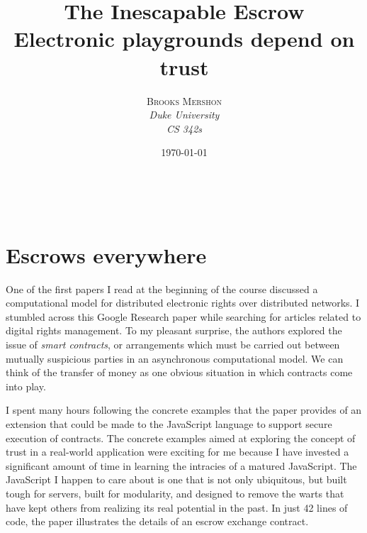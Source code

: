 \documentclass[a4paper, 11pt]{article} %
\title{\textbf{The Inescapable Escrow}\\ %
Electronic playgrounds depend on trust} %
\author{\textsc{Brooks Mershon} %
\\{\textit{Duke University}} %
\\{\textit{CS 342s}}} %
\date{\today} %
\makeatletter
\renewcommand{\maketitle}{ %
\begin{flushright} %
{\LARGE\@title} %

\vspace{50pt} %

{\large\@author} %
\\\@date %

\end{flushright}
}
\makeatother
\begin{document}
\maketitle %





\vspace{30pt} %


\section*{Escrows everywhere}

One of the first papers \cite{40673} I read at the beginning of the course discussed a computational model for distributed electronic rights over distributed networks. I stumbled across this Google Research paper while searching for articles related to digital rights management. To my pleasant surprise, the authors explored the issue of \textit{smart contracts}, or arrangements which must be carried out between mutually suspicious parties in an asynchronous computational model. We can think of the transfer of money as one obvious situation in which contracts come into play.

I spent many hours following the concrete examples that the paper provides of an extension that could be made to the JavaScript language to support secure execution of contracts.  The concrete examples aimed at exploring the concept of trust in a real-world application were exciting for me because I have invested a significant amount of time in learning the intracies of a matured JavaScript. The JavaScript I happen to care about is one that is not only ubiquitous, but built tough for servers, built for modularity, and designed to remove the warts that have kept others from realizing its real potential in the past. In just 42 lines of code, the paper illustrates the details of an escrow exchange contract.
\end{document}
